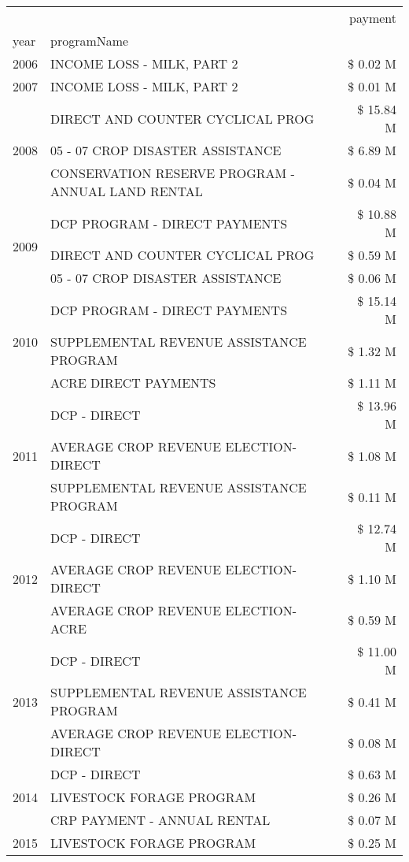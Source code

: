 \begin{tabular}{llr}
\toprule
 &  & payment \\
year & programName &  \\
\midrule
2006 & INCOME LOSS - MILK, PART 2 & \$ 0.02 M \\
\cline{1-3}
2007 & INCOME LOSS - MILK, PART 2 & \$ 0.01 M \\
\cline{1-3}
\multirow[t]{3}{*}{2008} & DIRECT AND COUNTER CYCLICAL PROG & \$ 15.84 M \\
 & 05 - 07 CROP DISASTER ASSISTANCE & \$ 6.89 M \\
 & CONSERVATION RESERVE PROGRAM - ANNUAL LAND RENTAL & \$ 0.04 M \\
\cline{1-3}
\multirow[t]{3}{*}{2009} & DCP PROGRAM - DIRECT PAYMENTS & \$ 10.88 M \\
 & DIRECT AND COUNTER CYCLICAL PROG & \$ 0.59 M \\
 & 05 - 07 CROP DISASTER ASSISTANCE & \$ 0.06 M \\
\cline{1-3}
\multirow[t]{3}{*}{2010} & DCP PROGRAM - DIRECT PAYMENTS & \$ 15.14 M \\
 & SUPPLEMENTAL REVENUE ASSISTANCE PROGRAM & \$ 1.32 M \\
 & ACRE DIRECT PAYMENTS & \$ 1.11 M \\
\cline{1-3}
\multirow[t]{3}{*}{2011} & DCP - DIRECT & \$ 13.96 M \\
 & AVERAGE CROP REVENUE ELECTION-DIRECT & \$ 1.08 M \\
 & SUPPLEMENTAL REVENUE ASSISTANCE PROGRAM & \$ 0.11 M \\
\cline{1-3}
\multirow[t]{3}{*}{2012} & DCP - DIRECT & \$ 12.74 M \\
 & AVERAGE CROP REVENUE ELECTION-DIRECT & \$ 1.10 M \\
 & AVERAGE CROP REVENUE ELECTION-ACRE & \$ 0.59 M \\
\cline{1-3}
\multirow[t]{3}{*}{2013} & DCP - DIRECT & \$ 11.00 M \\
 & SUPPLEMENTAL REVENUE ASSISTANCE PROGRAM & \$ 0.41 M \\
 & AVERAGE CROP REVENUE ELECTION-DIRECT & \$ 0.08 M \\
\cline{1-3}
\multirow[t]{3}{*}{2014} & DCP - DIRECT & \$ 0.63 M \\
 & LIVESTOCK FORAGE PROGRAM & \$ 0.26 M \\
 & CRP PAYMENT - ANNUAL RENTAL & \$ 0.07 M \\
\cline{1-3}
\multirow[t]{3}{*}{2015} & LIVESTOCK FORAGE PROGRAM & \$ 0.25 M \\

\end{tabular}
